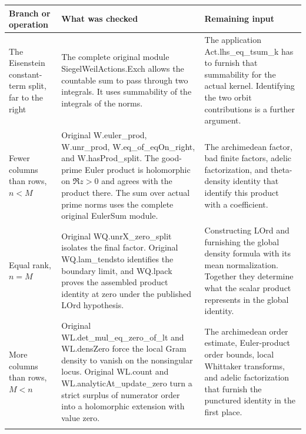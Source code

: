 \documentclass[11pt,letterpaper]{article}
\begin{document}
{\small
\begin{longtable}{@{}>{\raggedright\arraybackslash}p{0.24\dimexpr\linewidth-4\tabcolsep\relax}>{\raggedright\arraybackslash}p{0.38\dimexpr\linewidth-4\tabcolsep\relax}>{\raggedright\arraybackslash}p{0.38\dimexpr\linewidth-4\tabcolsep\relax}@{}}
\toprule
\textbf{Branch or operation} & \textbf{What was checked} & \textbf{Remaining input}\\\midrule\endhead
The Eisenstein constant-term split, far to the right & The complete original module {\ttfamily\small SiegelWeilActions.\allowbreak{}Exch} allows the countable sum to pass through two integrals. It uses summability of the integrals of the norms. & The application {\ttfamily\small Act.\allowbreak{}lhs\_\allowbreak{}eq\_\allowbreak{}tsum\_\allowbreak{}k} has to furnish that summability for the actual kernel. Identifying the two orbit contributions is a further argument.\\\addlinespace[4pt]
Fewer columns than rows, \(n<M\) & Original {\ttfamily\small W.\allowbreak{}euler\_\allowbreak{}prod}, {\ttfamily\small W.\allowbreak{}unr\_\allowbreak{}prod}, {\ttfamily\small W.\allowbreak{}eq\_\allowbreak{}of\_\allowbreak{}eqOn\_\allowbreak{}right}, and {\ttfamily\small W.\allowbreak{}hasProd\_\allowbreak{}split}. The good-prime Euler product is holomorphic on \(\Re z>0\) and agrees with the product there. The sum over actual prime norms uses the complete original {\ttfamily\small EulerSum} module. & The archimedean factor, bad finite factors, adelic factorization, and theta-density identity that identify this product with a coefficient.\\\addlinespace[4pt]
Equal rank, \(n=M\) & Original {\ttfamily\small WQ.\allowbreak{}unrX\_\allowbreak{}zero\_\allowbreak{}split} isolates the final factor. Original {\ttfamily\small WQ.\allowbreak{}lam\_\allowbreak{}tendsto} identifies the boundary limit, and {\ttfamily\small WQ.\allowbreak{}lpack} proves the assembled product identity at zero under the published {\ttfamily\small LOrd} hypothesis. & Constructing {\ttfamily\small LOrd} and furnishing the global density formula with its mean normalization. Together they determine what the scalar product represents in the global identity.\\\addlinespace[4pt]
More columns than rows, \(M<n\) & Original {\ttfamily\small WL.\allowbreak{}det\_\allowbreak{}mul\_\allowbreak{}eq\_\allowbreak{}zero\_\allowbreak{}of\_\allowbreak{}lt} and {\ttfamily\small WL.\allowbreak{}densZero} force the local Gram density to vanish on the nonsingular locus. Original {\ttfamily\small WL.\allowbreak{}count} and {\ttfamily\small WL.\allowbreak{}analyticAt\_\allowbreak{}update\_\allowbreak{}zero} turn a strict surplus of numerator order into a holomorphic extension with value zero. & The archimedean order estimate, Euler-product order bounds, local Whittaker transforms, and adelic factorization that furnish the punctured identity in the first place.\\\addlinespace[4pt]
\bottomrule\end{longtable}}
\end{document}
